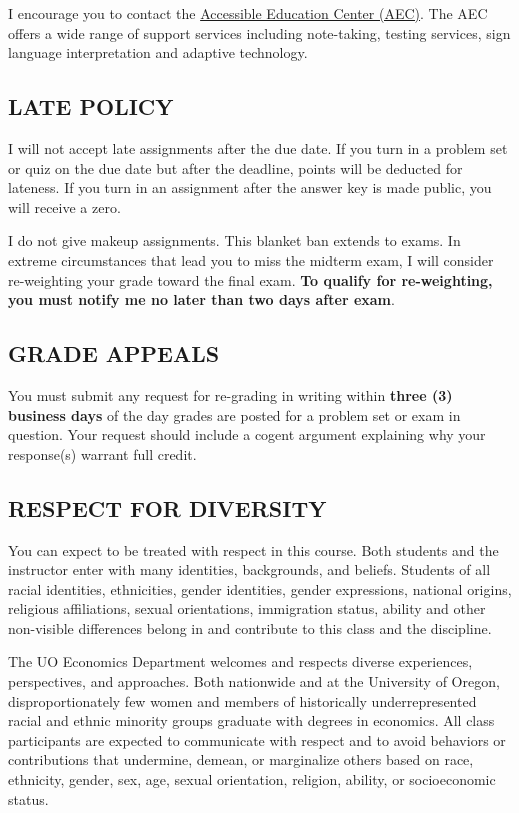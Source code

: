 \documentclass[11pt]{article}
\begin{document}
I encourage you to contact the \href{https://aec.uoregon.edu/}{Accessible Education Center (AEC)}. The AEC offers a wide range of support services including note-taking, testing services, sign language interpretation and adaptive technology.

\subsection*{LATE POLICY}
I will not accept late assignments after the due date. 
If you turn in a problem set or quiz on the due date but after the deadline, points will be deducted for lateness. 
If you turn in an assignment after the answer key is made public, you will receive a zero. 

I do not give makeup assignments. 
This blanket ban extends to exams. 
In extreme circumstances that lead you to miss the midterm exam, I will consider re-weighting your grade toward the final exam. 
\textbf{To qualify for re-weighting, you must notify me no later than two days after exam}. 

\subsection*{GRADE APPEALS}
You must submit any request for re-grading in writing within \textbf{three (3) business days} of the day grades are posted for a problem set or exam in question. 
Your request should include a cogent argument explaining why your response(s) warrant full credit. 

\subsection*{RESPECT FOR DIVERSITY}
You can expect to be treated with respect in this course.
Both students and the instructor enter with many identities, backgrounds, and beliefs.
Students of all racial identities, ethnicities, gender identities, gender expressions, national origins, religious affiliations, sexual orientations, immigration status, ability and other non-visible differences belong in and contribute to this class and the discipline.

The UO Economics Department welcomes and respects diverse experiences, perspectives, and approaches. 
Both nationwide and at the University of Oregon, disproportionately few women and members of historically underrepresented racial and ethnic minority groups graduate with degrees in economics. 
All class participants are expected to communicate with respect and to avoid behaviors or contributions that undermine, demean, or marginalize others based on race, ethnicity, gender, sex, age, sexual orientation, religion, ability, or socioeconomic status.
\end{document}
